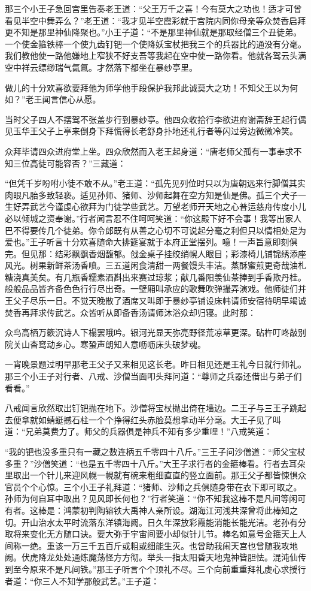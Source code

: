 \documentclass[12pt,UTF8]{ctexbook}
\begin{document}
{	那三个小王子急回宫里告奏老王道：“父王万千之喜！今有莫大之功也！适才可曾看见半空中舞弄么？”老王道：“我才见半空霞彩就于宫院内同你母亲等众焚香启拜更不知是那里神仙降聚也。”小王子道：“不是那里神仙就是那取经僧三个丑徒弟。一个使金箍铁棒一个使九齿钉钯一个使降妖宝杖把我三个的兵器比的通没有分毫。我们教他使一路他嫌地上窄狭不好支吾等我起在空中使一路你看。他就各驾云头满空中祥云缥缈瑞气氤氲。才然落下都坐在暴纱亭里。
	
	做儿的十分欢喜欲要拜他为师学他手段保护我邦此诚莫大之功！不知父王以为何如？”老王闻言信心从愿。
	
	当时父子四人不摆驾不张盖步行到暴纱亭。他四众收拾行李欲进府谢斋辞王起行偶见玉华王父子上亭来倒身下拜慌得长老舒身扑地还礼行者等闪过旁边微微冷笑。
	
	众拜毕请四众进府堂上坐。四众欣然而入老王起身道：“唐老师父孤有一事奉求不知三位高徒可能容否？”三藏道：
	
	“但凭千岁吩咐小徒不敢不从。”老王道：“孤先见列位时只以为唐朝远来行脚僧其实肉眼凡胎多致轻亵。适见孙师、猪师、沙师起舞在空方知是仙是佛。孤三个犬子一生好弄武艺今谨虔心欲拜为门徒学些武艺。万望老师开天地之心普运慈舟传度小儿必以倾城之资奉谢。”行者闻言忍不住呵呵笑道：“你这殿下好不会事！我等出家人巴不得要传几个徒弟。你令郎既有从善之心切不可说起分毫之利但只以情相处足为爱也。”王子听言十分欢喜随命大排筵宴就于本府正堂摆列。噫！一声旨意即刻俱完。但见那：结彩飘飖香烟馥郁。戗金桌子挂绞绡幌人眼目；彩漆椅儿铺锦绣添座风光。树果新鲜茶汤香喷。三五道闲食清甜一两餐馒头丰洁。蒸酥蜜煎更奇哉油札糖浇真美矣。有几瓶香糯素酒斟出来赛过琼浆；献几番阳羡仙茶捧到手香欺丹桂。般般品品皆齐备色色行行尽出奇。一壁厢叫承应的歌舞吹弹撮弄演戏。他师徒们并王父子尽乐一日。不觉天晚散了酒席又叫即于暴纱亭铺设床帏请师安宿待明早竭诚焚香再拜求传武艺。众皆听从即备香汤请师沐浴众却归寝。此时那：
	
	众鸟高栖万簌沉诗人下榻罢哦吟。银河光显天弥亮野径荒凉草更深。砧杵叮咚敲别院关山杳窎动乡心。寒蛩声朗知人意呖呖床头破梦魂。
	
	一宵晚景题过明早那老王父子又来相见这长老。昨日相见还是王礼今日就行师礼。那三个小王子对行者、八戒、沙僧当面叩头拜问道：“尊师之兵器还借出与弟子们看看。”
	
	八戒闻言欣然取出钉钯抛在地下。沙僧将宝杖抛出倚在墙边。二王子与三王子跳起去便拿就如蜻蜓撼石柱一个个挣得红头赤脸莫想拿动半分毫。大王子见了叫道：“兄弟莫费力了。师父的兵器俱是神兵不知有多少重哩！”八戒笑道：
	
	“我的钯也没多重只有一藏之数连柄五千零四十八斤。”三王子问沙僧道：“师父宝杖多重？”沙僧笑道：“也是五千零四十八斤。”大王子求行者的金箍棒看。行者去耳朵里取出一个针儿来迎风幌一幌就有碗来粗细直直的竖立面前。那王父子都皆悚惧众官员个个心惊。三个小王子礼拜道：“猪师、沙师之兵俱随身带在衣下即可取之。孙师为何自耳中取出？见风即长何也？”行者笑道：“你不知我这棒不是凡间等闲可有者。这棒是：鸿蒙初判陶镕铁大禹神人亲所设。湖海江河浅共深曾将此棒知之切。开山治水太平时流落东洋镇海阙。日久年深放彩霞能消能长能光洁。老孙有分取将来变化无方随口诀。要大弥于宇宙间要小却似针儿节。棒名如意号金箍天上人间称一绝。重该一万三千五百斤或粗或细能生灭。也曾助我闹天宫也曾随我攻地阙。伏虎降龙处处通炼魔荡怪方方彻。举头一指太阳昏天地鬼神皆胆怯。混沌仙传到至今原来不是凡间铁。”那王子听言个个顶礼不尽。三个向前重重拜礼虔心求授行者道：“你三人不知学那般武艺。”王子道：
	
}
\end{document}
